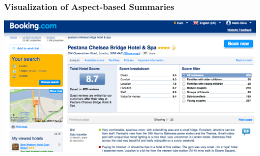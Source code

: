 \documentclass[t]{beamer}
\begin{document}
\begin{frame} \frametitle{Visualization of Aspect-based Summaries} %


\begin{block}{} %

\begin{center}
     \includegraphics[width=\textwidth]{booking-aspect-summary}
\end{center}
\end{block}

\end{frame} 



\end{document}

